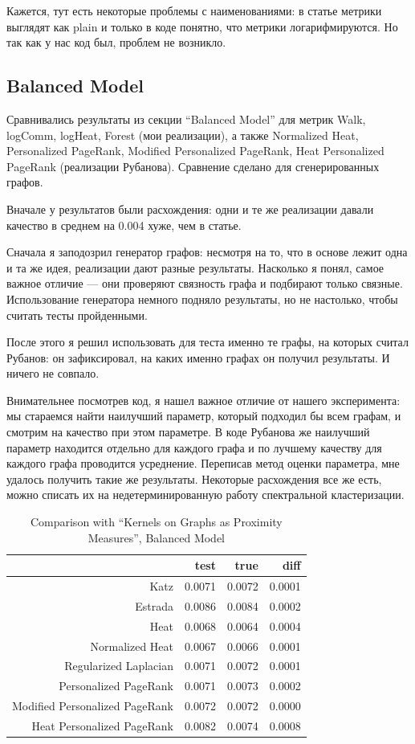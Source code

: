 \documentclass{article}
\begin{document}
Кажется, тут есть некоторые проблемы с наименованиями: в статье метрики выглядят как plain и только в коде понятно, что метрики логарифмируются. Но так как у нас код был, проблем не возникло.

\subsection{Balanced Model}
Сравнивались результаты из секции ``Balanced Model'' для метрик Walk, logComm, logHeat, Forest (мои реализации), а также Normalized Heat, Personalized PageRank, Modified Personalized PageRank, Heat Personalized PageRank (реализации Рубанова). Сравнение сделано для сгенерированных графов.

Вначале у результатов были расхождения: одни и те же реализации давали качество в среднем на 0.004 хуже, чем в статье.

Сначала я заподозрил генератор графов: несмотря на то, что в основе лежит одна и та же идея, реализации дают разные результаты. Насколько я понял, самое важное отличие --- они проверяют связность графа и подбирают только связные. Использование генератора немного подняло результаты, но не настолько, чтобы считать тесты пройденными.

После этого я решил использовать для теста именно те графы, на которых считал Рубанов: он зафиксировал, на каких именно графах он получил результаты. И ничего не совпало.

Внимательнее посмотрев код, я нашел важное отличие от нашего эксперимента: мы стараемся найти наилучший параметр, который подходил бы всем графам, и смотрим на качество при этом параметре. В коде Рубанова же наилучший параметр находится отдельно для каждого графа и по лучшему качеству для каждого графа проводится усреднение. Переписав метод оценки параметра, мне удалось получить такие же результаты. Некоторые расхождения все же есть, можно списать их на недетерминированную работу спектральной кластеризации.

\begin{table}[H]
\centering
\caption{Comparison with ``Kernels on Graphs as Proximity Measures'', Balanced Model}
\label{my-label}
\begin{tabular}{r|rrr}
                               & test   & true   & diff   \\
                               \hline
Katz                           & 0.0071 & 0.0072 & 0.0001 \\
Estrada                        & 0.0086 & 0.0084 & 0.0002 \\
Heat                           & 0.0068 & 0.0064 & 0.0004 \\
Normalized Heat                & 0.0067 & 0.0066 & 0.0001 \\
Regularized Laplacian          & 0.0071 & 0.0072 & 0.0001 \\
Personalized PageRank          & 0.0071 & 0.0073 & 0.0002 \\
Modified Personalized PageRank & 0.0072 & 0.0072 & 0.0000 \\
Heat Personalized PageRank     & 0.0082 & 0.0074 & 0.0008
\end{tabular}
\end{table}
\end{document}

